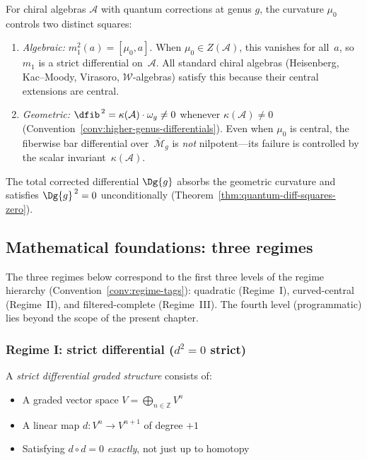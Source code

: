 For chiral algebras $\mathcal{A}$ with quantum corrections at genus $g$,
the curvature $\mu_0$ controls two distinct squares:
\begin{enumerate}[label=\textup{(\roman*)}]
\item \emph{Algebraic:}\; $m_1^2(a) = [\mu_0, a]$.
  When $\mu_0 \in Z(\mathcal{A})$, this vanishes for all~$a$, so $m_1$ is a strict differential on~$\mathcal{A}$.  All standard chiral algebras (Heisenberg, Kac--Moody, Virasoro, $\mathcal{W}$-algebras) satisfy this because their central extensions are central.
\item \emph{Geometric:}\; $\dfib^{\,2} = \kappa(\mathcal{A})\cdot\omega_g \neq 0$ whenever $\kappa(\mathcal{A}) \neq 0$
  (Convention~\ref{conv:higher-genus-differentials}).
  Even when $\mu_0$ is central, the fiberwise bar differential over~$\overline{\mathcal{M}}_g$ is \emph{not} nilpotent---its failure is controlled by the scalar invariant~$\kappa(\mathcal{A})$.
\end{enumerate}
The total corrected differential $\Dg{g}$ absorbs the geometric curvature and satisfies $\Dg{g}^{\,2} = 0$ unconditionally (Theorem~\ref{thm:quantum-diff-squares-zero}).

\subsection{Mathematical foundations: three regimes}
\label{subsec:three-regimes}

The three regimes below correspond to the first three levels of the
regime hierarchy (Convention~\ref{conv:regime-tags}): quadratic
(Regime~I), curved-central (Regime~II), and filtered-complete
(Regime~III).  The fourth level (programmatic) lies beyond the
scope of the present chapter.

\subsubsection{\texorpdfstring{Regime I: strict differential ($d^2 = 0$ strict)}{Regime I: strict differential (d2 = 0 strict)}}

\begin{definition}\label{def:strict-dg}
A \emph{strict differential graded structure} consists of:
\begin{itemize}
\item A graded vector space $V = \bigoplus_{n \in \mathbb{Z}} V^n$
\item A linear map $d: V^n \to V^{n+1}$ of degree $+1$
\item Satisfying $d \circ d = 0$ \emph{exactly}, not just up to homotopy
\end{itemize}
\end{definition}

